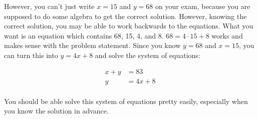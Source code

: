\documentclass[fleqn,addpoints]{exam}
\begin{document}
\begin{questions}
\begin{solution}[1cm]
However, you can't just write $x = 15$ and $y = 68$ on your exam, because you are supposed to do some algebra to get the correct
solution.  However, knowing the correct solution, you may be able to work backwards to the equations.  What you want is
an equation which contains 68, 15, 4, and 8.  $68 = 4 \cdot 15 + 8$ works and makes sense with the problem statement.
Since you know $y=68$ and $x=15$, you can turn this into $y = 4x + 8$ and solve the system of equations:

\begin{align*}
  x+y &= 83 \\
  y &= 4x + 8 \\
\end{align*}

You should be able solve this system of equations pretty easily, especially when you know the solution in advance.

\end{solution}


\end{questions}
\end{document}
